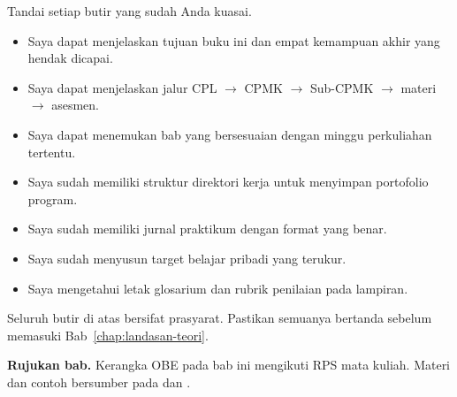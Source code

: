 \begin{checklistbox}
Tandai setiap butir yang sudah Anda kuasai.

\begin{itemize}
    \item[\checkbox] Saya dapat menjelaskan tujuan buku ini dan empat
          kemampuan akhir yang hendak dicapai.
    \item[\checkbox] Saya dapat menjelaskan jalur CPL $\rightarrow$
          CPMK $\rightarrow$ Sub-CPMK $\rightarrow$ materi
          $\rightarrow$ asesmen.
    \item[\checkbox] Saya dapat menemukan bab yang bersesuaian dengan
          minggu perkuliahan tertentu.
    \item[\checkbox] Saya sudah memiliki struktur direktori kerja
          untuk menyimpan portofolio program.
    \item[\checkbox] Saya sudah memiliki jurnal praktikum dengan
          format yang benar.
    \item[\checkbox] Saya sudah menyusun target belajar pribadi yang
          terukur.
    \item[\checkbox] Saya mengetahui letak glosarium dan rubrik
          penilaian pada lampiran.
\end{itemize}

\vspace{0.4em}
Seluruh butir di atas bersifat prasyarat. Pastikan semuanya bertanda
sebelum memasuki Bab~\ref{chap:landasan-teori}.
\end{checklistbox}

\begin{infobox}
\textbf{Rujukan bab.} Kerangka OBE pada bab ini mengikuti RPS mata
kuliah. Materi dan contoh bersumber pada \cite{gunawan2019} dan
\cite{sto2001}.
\end{infobox}

